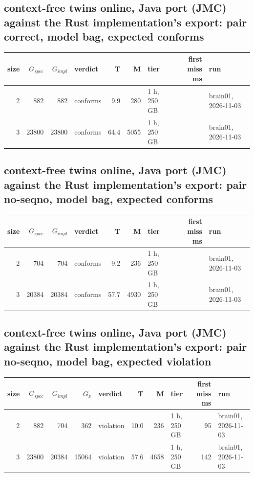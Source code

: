 \documentclass[10pt]{article}
\begin{document}
\subsection*{context-free twins online, Java port (JMC) against the Rust implementation's export: pair \textsf{correct}, model bag, expected conforms}
\begin{longtable}{@{}rrrlrrlrl@{}}
\toprule
size & $G_{\mathit{spec}}$ & $G_{\mathit{impl}}$ & verdict & T & M & tier & first miss ms & run \\
\midrule
\endhead
\color{blue} 2 & 882 & 882 & conforms & 9.9 & 280 & 1 h, 250 GB &  & brain01, 2026-11-03 \\
\color{blue} 3 & 23800 & 23800 & conforms & 64.4 & 5055 & 1 h, 250 GB &  & brain01, 2026-11-03 \\
\bottomrule
\end{longtable}
\subsection*{context-free twins online, Java port (JMC) against the Rust implementation's export: pair \textsf{no-seqno}, model bag, expected conforms}
\begin{longtable}{@{}rrrlrrlrl@{}}
\toprule
size & $G_{\mathit{spec}}$ & $G_{\mathit{impl}}$ & verdict & T & M & tier & first miss ms & run \\
\midrule
\endhead
\color{blue} 2 & 704 & 704 & conforms & 9.2 & 236 & 1 h, 250 GB &  & brain01, 2026-11-03 \\
\color{blue} 3 & 20384 & 20384 & conforms & 57.7 & 4930 & 1 h, 250 GB &  & brain01, 2026-11-03 \\
\bottomrule
\end{longtable}
\subsection*{context-free twins online, Java port (JMC) against the Rust implementation's export: pair \textsf{no-seqno}, model bag, expected violation}
\begin{longtable}{@{}rrrrlrrlrl@{}}
\toprule
size & $G_{\mathit{spec}}$ & $G_{\mathit{impl}}$ & $G_x$ & verdict & T & M & tier & first miss ms & run \\
\midrule
\endhead
\color{blue} 2 & 882 & 704 & 362 & violation & 10.0 & 236 & 1 h, 250 GB & 95 & brain01, 2026-11-03 \\
\color{blue} 3 & 23800 & 20384 & 15064 & violation & 57.6 & 4658 & 1 h, 250 GB & 142 & brain01, 2026-11-03 \\
\bottomrule
\end{longtable}
\end{document}
